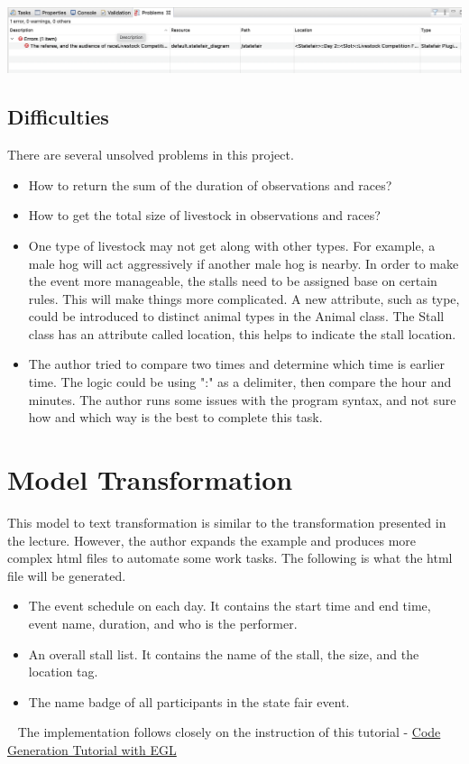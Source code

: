 \documentclass[12pt]{article}
\begin{document}
\includegraphics[scale = 0.4]{img/graph-editor-error2}

\subsection{Difficulties}
There are several unsolved problems in this project.

\begin{itemize}
    \item How to return the sum of the duration of observations and races? 
    \item How to get the total size of livestock in observations and races?
    \item One type of livestock may not get along with other types. For example, a male hog will 
    act aggressively if another male hog is nearby. In order to make the event more manageable, 
    the stalls need to be assigned base on certain rules. This will make things more complicated. 
    A new attribute, such as type, could be introduced to distinct animal types in the Animal 
    class. The Stall class has an attribute called location, this helps to indicate the stall location.
    \item The author tried to compare two times and determine which time is earlier time. The logic 
    could be using ":" as a delimiter, then compare the hour and minutes. The author runs some issues 
    with the program syntax, and not sure how and which way is the best to complete this task.
\end{itemize}

\pagebreak
\section{Model Transformation}
This model to text transformation is similar to the transformation presented in the lecture. However, the author expands the example 
and produces more complex html files to automate some work tasks. The following is what the html file will be generated.
\begin{itemize}
    \item The event schedule on each day. It contains the start time and end time, event name, duration, and who is the performer.
    \item An overall stall list. It contains the name of the stall, the size, and the location tag.
    \item The name badge of all participants in the state fair event.
\end{itemize}
~\newline
The implementation follows closely on the instruction of this tutorial - 
\href{https://www.eclipse.org/epsilon/doc/articles/code-generation-tutorial-egl/}{Code Generation Tutorial with EGL}
\end{document}
